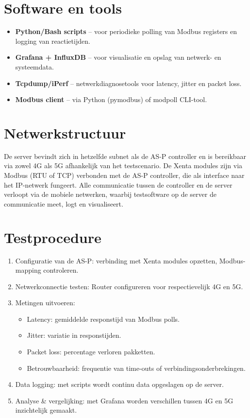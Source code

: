 \section{Software en tools}

\begin{itemize}
    \item \textbf{Python/Bash scripts} – voor periodieke polling van Modbus registers en logging van reactietijden.
    \item \textbf{Grafana + InfluxDB} – voor visualisatie en opslag van netwerk- en systeemdata.
    \item \textbf{Tcpdump/iPerf} – netwerkdiagnosetools voor latency, jitter en packet loss.
    \item \textbf{Modbus client} – via Python (pymodbus) of modpoll CLI-tool.
\end{itemize}

\section{Netwerkstructuur}

De server bevindt zich in hetzelfde subnet als de AS-P controller en is bereikbaar via zowel 4G als 5G afhankelijk van het testscenario. De Xenta modules zijn via Modbus (RTU of TCP) verbonden met de AS-P controller, die als interface naar het IP-netwerk fungeert. Alle communicatie tussen de controller en de server verloopt via de mobiele netwerken, waarbij testsoftware op de server de communicatie meet, logt en visualiseert.

\section{Testprocedure}

\begin{enumerate}
    \item Configuratie van de AS-P: verbinding met Xenta modules opzetten, Modbus-mapping controleren.
    \item Netwerkconnectie testen: Router configureren voor respectievelijk 4G en 5G.
    \item Metingen uitvoeren:
    \begin{itemize}
        \item Latency: gemiddelde responstijd van Modbus polls.
        \item Jitter: variatie in responstijden.
        \item Packet loss: percentage verloren pakketten.
        \item Betrouwbaarheid: frequentie van time-outs of verbindingsonderbrekingen.
    \end{itemize}
    \item Data logging: met scripts wordt continu data opgeslagen op de server.
    \item Analyse \& vergelijking: met Grafana worden verschillen tussen 4G en 5G inzichtelijk gemaakt.
\end{enumerate}

